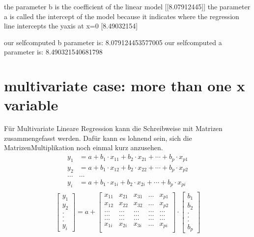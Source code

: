 \documentclass[letterpaper,10pt,english]{jupyterBook}
\begin{document}
\begin{sphinxVerbatim}[commandchars=\\\{\}]
the parameter b is the coefficient of the linear model [[8.07912445]]
the parameter a is called the intercept of the model because it indicates
 where the regression line intercepts the y\PYGZhy{}axis at x=0 [\PYGZhy{}8.49032154]

our self\PYGZhy{}computed b parameter is: 8.079124453577005
our self\PYGZhy{}computed a parameter is: \PYGZhy{}8.490321540681798
\end{sphinxVerbatim}


\chapter{multivariate case: more than one x variable}
\label{\detokenize{Regression_Techniques:multivariate-case-more-than-one-x-variable}}
\sphinxAtStartPar
Für Multivariate Lineare Regression kann die Schreibweise mit Matrizen zusammengefasst werden. Dafür kann es lohnend sein, sich die Matrizen\sphinxhyphen{}Multiplikation noch einmal kurz anzusehen.
\begin{align*}
    y_1&=a+b_1\cdot x_{11}+b_2\cdot x_{21}+\cdots + b_p\cdot x_{p1}\\
    y_2&=a+b_1\cdot x_{12}+b_2\cdot x_{22}+\cdots + b_p\cdot x_{p2}\\
    \ldots& \ldots\\
    y_i&=a+b_1\cdot x_{1i}+b_2\cdot x_{2i}+\cdots + b_p\cdot x_{pi}\\
\end{align*}\begin{equation*}
    \begin{bmatrix}
      y_1\\
      y_2\\
      .  \\
      .  \\
      .  \\
      y_i
    \end{bmatrix}
    = a+
    \begin{bmatrix}
      x_{11} & x_{21} & x_{31} & \ldots & x_{p1}\\
      x_{12} & x_{22} & x_{32} & \ldots & x_{p2}\\
      \ldots&\ldots&\ldots&\ldots&\ldots\\
      \ldots&\ldots&\ldots&\ldots&\ldots\\
      \ldots&\ldots&\ldots&\ldots&\ldots\\
      x_{1i} & x_{2i} & x_{3i} & \ldots & x_{pi}\\
    \end{bmatrix}
    \cdot
    \begin{bmatrix}
 b_1\\
      b_2\\
      .\\
      .\\
      .\\
      b_p
    \end{bmatrix}
\end{equation*}
\end{document}
